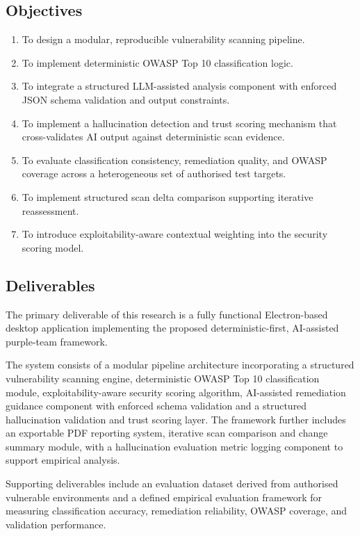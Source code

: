 \documentclass[12pt, a4paper, oneside]{report}
\begin{document}
\subsection{Objectives}

\begin{enumerate}[label=\Alph*.]
  \item To design a modular, reproducible vulnerability scanning pipeline.
  \item To implement deterministic OWASP Top 10 classification logic.
  \item To integrate a structured LLM-assisted analysis component with enforced
    JSON schema validation and output constraints.
  \item To implement a hallucination detection and trust scoring mechanism that
    cross-validates AI output against deterministic scan evidence.
  \item To evaluate classification consistency, remediation quality, and OWASP
    coverage across a heterogeneous set of authorised test targets.
  \item To implement structured scan delta comparison supporting iterative
    reassessment.
  \item To introduce exploitability-aware contextual weighting into the security
    scoring model.
\end{enumerate}

\subsection{Deliverables}

The primary deliverable of this research is a fully functional
Electron-based desktop application implementing the proposed
deterministic-first, AI-assisted purple-team framework.

The system consists of a modular pipeline architecture incorporating a
structured vulnerability scanning engine, deterministic OWASP Top 10
classification module, exploitability-aware security scoring algorithm,
AI-assisted remediation guidance component with enforced schema
validation and a structured hallucination validation and trust scoring
layer. The framework further includes an exportable PDF reporting
system, iterative scan comparison and change summary module, with a
hallucination evaluation metric logging component to support empirical
analysis.

Supporting deliverables include an evaluation dataset derived from
authorised vulnerable environments and a defined empirical evaluation
framework for measuring classification accuracy, remediation
reliability, OWASP coverage, and validation performance.
\end{document}
